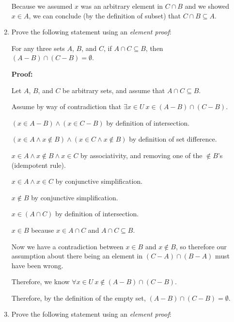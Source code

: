 \documentclass[11pt, letterpaper]{report}
\begin{document}
\begin{enumerate}
        Because we assumed $x$ was an arbitrary element in $C \cap B$ and we showed $x \in A$, we can conclude (by the definition of subset)
        that $C \cap B \subseteq A$.
                

	
	
	 \item Prove the following statement using an \textit{element proof}:
        
        For any three sets $A$, $B$, and $C$, if $A \cap C \subseteq B$, then
        $(A-B) \cap (C-B) = \emptyset$.
        
        
        \textbf{Proof:}
                
        Let $A$, $B$, and $C$ be arbitrary sets, and assume that $A \cap C \subseteq B$.
        
        Assume by way of contradiction that $\exists x \in U \ x \in (A-B) \cap (C-B)$.
        
        $(x \in A-B) \land (x \in C-B)$ by definition of intersection.
        
        $(x \in A \land x \not\in B) \land (x \in C \land x \not\in B)$ by definition of set difference.
        
        $x \in A \land x \not\in B \land x \in C$ by associativity, and removing one of the $\not\in B$'s (idempotent rule).
        
        $x \in A \land x \in C$ by conjunctive simplification.%
        
        $x \not\in B$ by conjunctive simplification.
        
        $x \in (A \cap C)$ by definition of intersection.
        
        $x \in B$ because $x \in A \cap C$ and $A\cap C \subseteq B$.
        
        Now we have a contradiction between $x \in B$ and $x \not\in B$, so therefore our
        assumption about there being an element in $(C-A) \cap (B-A)$ must have been wrong.
        
        Therefore, we know $\forall x \in U \ x \not\in (A-B) \cap (C-B)$.
        
        Therefore, by the definition of the empty set, $(A-B) \cap (C-B) = \emptyset$.
        
                

        
        \item Prove the following statement using an \textit{element proof}:
        

\end{enumerate}
\end{document}
